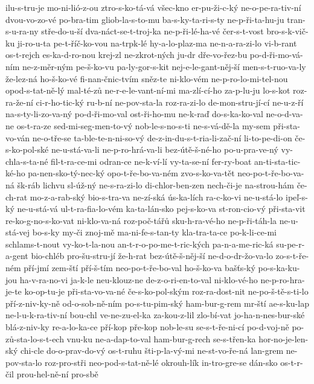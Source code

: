 {ilu-s-tru-je
mo-ni-lió-z-ou
ztro-s-ko-tá-vá
všec-kno
er-pu-ži-c-ký
ne-o-pe-ra-tiv-ní
dvou-vo-zo-vé
po-bra-tim
gliob-la-s-to-mu
ba-s-ky-ta-ri-s-ty
ne-p-ři-ta-hu-ju
tran-s-u-ra-ny
stře-do-u-ší
dva-náct-se-t-troj-ka
ne-p-ři-lé-ha-vé
čer-s-t-vost
bro-s-k-vič-ku
ji-ro-u-ta
pe-t-říč-ko-vou
na-trpk-lé
hy-a-lo-plaz-ma
ne-n-a-ra-zi-lo
vi-b-rant
os-t-rejch
es-ka-d-ro-nou
krej-zl
ne-zkrot-ných
ju-dr
dře-vo-řez-bu
po-d-ři-mo-vá-ním
ne-z-měr-ným
pe-š-ko-vu
pa-ly-gor-s-kit
nej-e-le-gant-něj-ší
men-s-t-ruo-va-ly
že-lez-ná
ho-š-ko-vé
fi-nan-čnic-tvím
sněz-te
ni-klo-vém
ne-p-ro-lo-mi-tel-nou
opod-s-tat-ně-lý
mal-té-zů
ne-r-e-le-vant-ní-mi
ma-zlí-cí-ho
za-p-lu-ju
lo-s-kot
roz-ra-že-ní
ci-r-ho-tic-ký
ru-b-ní
ne-pov-sta-la
roz-ra-zi-lo
de-mon-stru-jí-cí
ne-u-z-ří
na-s-ty-li-zo-va-ný
po-d-ři-mo-val
ost-ři-ho-mu
ne-k-raď
do-s-ka-ko-val
ne-o-d-va-ne
os-t-ra-ze
sed-mi-seg-men-to-vý
nob-le-s-no-s-ti
ne-s-vá-dě-la
my-sem
při-sta-vo-ván
ne-o-tře-se
ta-ble-te-n-ni-so-vý
de-z-in-du-s-t-ria-li-zač-ní
li-to-pe-di-on
če-s-ko-pol-ské
ne-u-stá-va-li
ne-p-ro-hrá-va-li
bez-útě-š-né-ho
po-u-pra-ve-ný
vy-chla-s-ta-né
fil-t-ra-ce-mi
odran-ce
ne-k-ví-lí
vy-ta-se-ní
fer-ry-boat
an-ti-sta-tic-ké-ho
pa-nen-sko-tý-nec-ký
opo-t-ře-bo-va-ném
zvo-s-ko-va-tět
neo-po-t-ře-bo-va-ná
šk-ráb
lichvu
sl-úž-ný
ne-s-ra-zi-lo
di-chlor-ben-zen
nech-či-je
na-strou-hám
če-ch-rat
mo-z-a-rab-ský
bio-s-tra-va
ne-zí-ská
ús-ka-lích
ra-c-ko-vi
ne-u-stá-lo
ipeľ-s-ký
ne-u-stá-vá
ul-t-ra-fia-lo-vém
ka-ta-lán-sko
pej-s-ko-va
st-ron-cio-vý
při-sta-vit
re-ko-g-no-s-ko-vat
ni-klo-va-ná
roz-poč-tářů
sku-h-ra-vé-ho
ne-p-ři-táh-la
ne-u-stá-vej
bo-s-ky
my-či
znoj-mě
ma-ni-fe-s-tan-ty
kla-tra-ta-ce
po-k-li-ce-mi
schlams-t-nout
vy-ko-t-la-nou
an-t-r-o-po-me-t-ric-kých
pa-n-a-me-ric-ká
su-pe-r-a-gent
bio-chléb
pro-šu-stru-jí
že-h-rat
bez-útě-š-něj-ší
ne-d-o-dr-žo-va-lo
zo-s-t-ře-ném
pří-jmí
zem-ští
pří-š-tím
neo-po-t-ře-bo-val
ho-š-ko-va
bašťs-ký
po-s-ka-ku-jou
ha-v-ra-no-vi
ja-k-le
neu-klouz-ne
de-z-o-ri-en-to-val
ni-klo-vé-ho
ne-p-ro-hra-je-te
ko-op-tu-je
při-sta-vo-va-né
če-s-ko-pol-ským
roz-ra-dost-nit
ne-po-š-tě-s-ti-lo
pří-z-niv-ky-ně
od-o-sob-ně-ním
po-s-tu-pim-ský
ham-bur-g-rem
mr-ští
ae-s-ku-lap
ne-l-u-k-ra-tiv-ní
bou-chl
ve-ne-zu-el-ka
za-kou-z-lil
zlo-bí-vat
jo-ha-n-nes-bur-ské
blá-z-niv-ky
re-a-lo-ka-ce
pří-kop
pře-kop
nob-le-su
se-s-t-ře-ni-cí
po-d-voj-ně
po-zů-sta-lo-s-t-ech
vnu-ku
ne-a-dap-to-val
ham-bur-g-rech
se-s-třen-ka
hor-no-je-len-ský
chi-cle
do-o-prav-do-vý
os-t-ruhu
šti-p-la-vý-mi
ne-st-vo-ře-ná
lan-grem
ne-pov-sta-lo
roz-pro-stři
neo-pod-s-tat-ně-lé
okrouh-lík
in-tro-gre-se
dán-sko
os-t-r-čil
prou-hel-ně-ní
pro-sbě
}
